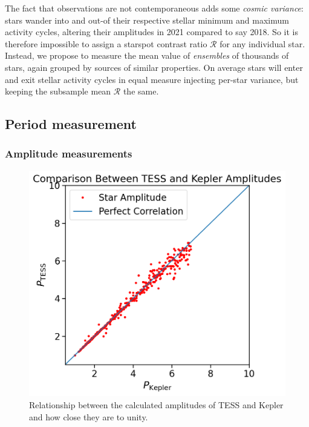 \documentclass[modern]{aastex631}
\begin{document}
The fact that observations are not contemporaneous adds some \emph{cosmic variance}: stars wander into and out-of their respective stellar minimum and maximum activity cycles, altering their amplitudes in 2021 compared to say 2018. So it is therefore impossible to assign a starspot contrast ratio $\mathcal{R}$ for any individual star. Instead, we propose to measure the mean value of \emph{ensembles} of thousands of stars, again grouped by sources of similar properties. On average stars will enter and exit stellar activity cycles in equal measure injecting per-star variance, but keeping the subsample mean $\mathcal{R}$ the same.

\subsection{Period measurement}


\subsubsection{Amplitude measurements}


\begin{figure}[!htb]
  \centering
  \includegraphics[scale=0.5]{Comparison Between TESS and Kepler Amplitudes.png}
  \caption{Relationship between the calculated amplitudes of TESS and Kepler and how close they are to unity.}
\end{figure}
\FloatBarrier
\end{document}
